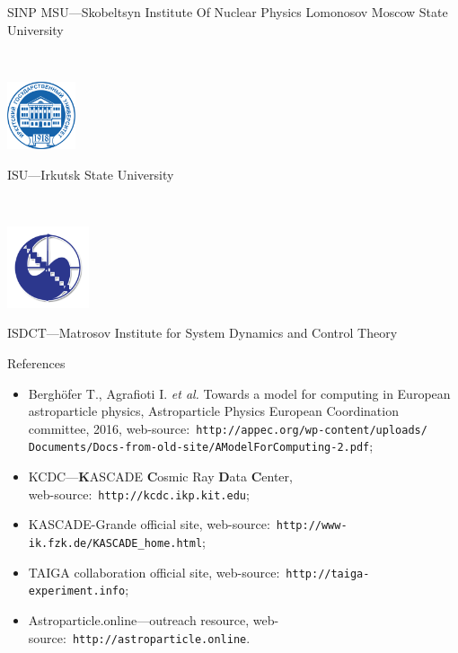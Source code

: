 \documentclass[18pt]{beamer}
\begin{document}
\begin{frame}[allowframebreaks]
{}\hfill
\parbox{0.75\textwidth}{
  SINP MSU---Skobeltsyn Institute Of Nuclear Physics Lomonosov Moscow State University
}
\\\vspace{1em}
\parbox{0.20\textwidth}{
  \centering\includegraphics[width=0.15\textwidth]{pics/isu_logo.png}
}\hfill
\parbox{0.75\textwidth}{
  ISU---Irkutsk State University
}
\\\vspace{1em}
\parbox{0.20\textwidth}{
  \centering\includegraphics[width=0.18\textwidth]{pics/matr_logo.png}
}\hfill
\parbox{0.75\textwidth}{
  ISDCT---Matrosov Institute for System Dynamics and Control Theory
}
\end{frame}

\begin{frame}{References}
  \begin{itemize}
   \item Berghöfer T., Agrafioti I. \textit{et al.} Towards a model for computing in European astroparticle physics,
   Astroparticle Physics European Coordination committee, 2016,
   web-source:~\texttt{http://appec.org/wp-content/uploads/\\Documents/Docs-from-old-site/AModelForComputing-2.pdf};
   \item KCDC---\textbf{K}ASCADE \textbf{C}osmic Ray \textbf{D}ata \textbf{C}enter,\\
   web-source:~\texttt{http://kcdc.ikp.kit.edu};
   \item KASCADE-Grande official site, web-source:~\texttt{http://www-ik.fzk.de/KASCADE\_home.html};
   \item TAIGA collaboration official site, web-source:~\texttt{http://taiga-experiment.info};
   \item Astroparticle.online---outreach resource, web-source:~\texttt{http://astroparticle.online}.

  \end{itemize}

\end{frame}



\backupend
\end{document}
